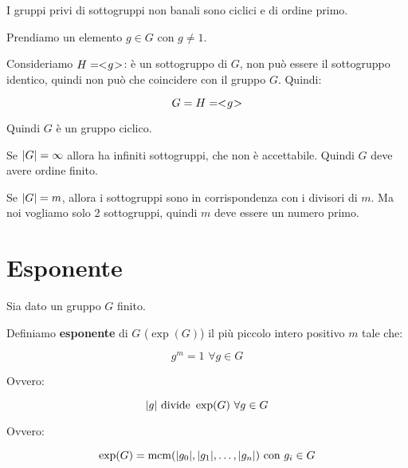\begin{teorema}
	I gruppi privi di sottogruppi non banali sono ciclici e di ordine primo.
\end{teorema}
\begin{dimostrazione}
	Prendiamo un elemento $g \in G$ con $g \ne 1$.
	
	Consideriamo $H = < \negmedspace g \negmedspace >$: è un sottogruppo di $G$, non può essere il sottogruppo identico, quindi non può che coincidere con il gruppo $G$. Quindi:
	
	\begin{equation}
		G = H = < \negmedspace g \negmedspace >
	\end{equation}

	Quindi $G$ è un gruppo ciclico.
	
	Se $\lvert G \rvert = \infty$ allora ha infiniti sottogruppi, che non è accettabile. Quindi $G$ deve avere ordine finito.
	
	Se $\lvert G \rvert = m$, allora i sottogruppi sono in corrispondenza con i divisori di $m$. Ma noi vogliamo solo 2 sottogruppi, quindi $m$ deve essere un numero primo.
\end{dimostrazione}

\section{Esponente}

Sia dato un gruppo $G$ finito.

Definiamo \textbf{esponente} di $G$ ($\exp(G)$) il più piccolo intero positivo $m$ tale che:

\begin{equation}
	g^m = 1 \,\, \forall g \in G	
\end{equation}
 
Ovvero:

\begin{equation}
	\lvert g \rvert \text{ divide } \exp(G) \,\, \forall g \in G
\end{equation}

Ovvero:

\begin{equation}
	\exp(G) = \operatorname{mcm}(\lvert g_0 \rvert, \lvert g_1 \rvert, \dots, \lvert g_n \rvert) \,\, \text{con } g_i \in G
\end{equation}

